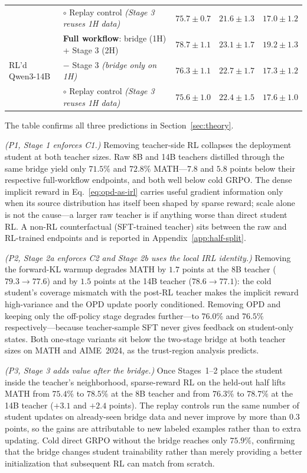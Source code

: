 \documentclass{article}
\begin{document}
\begin{table}[t]
\begin{tabular}{@{}llccc@{}}
  & $\circ$ Replay control \emph{(Stage 3 reuses 1H data)} & $75.7 \pm 0.7$ & $21.6 \pm 1.3$ & $17.0 \pm 1.2$ \\
\cmidrule(lr){2-5}
\multirow{3}{*}{RL'd Qwen3-14B}
  & \textbf{Full workflow}: bridge (1H) + Stage 3 (2H)    & $\mathbf{78.7 \pm 1.1}$ & $23.1 \pm 1.7$ & $\mathbf{19.2 \pm 1.3}$ \\
  & $-$ Stage 3 \emph{(bridge only on 1H)}                & $76.3 \pm 1.1$ & $22.7 \pm 1.7$ & $17.3 \pm 1.2$ \\
  & $\circ$ Replay control \emph{(Stage 3 reuses 1H data)} & $75.6 \pm 1.0$ & $22.4 \pm 1.5$ & $17.6 \pm 1.0$ \\
\bottomrule
\end{tabular}
\end{table}

The table confirms all three predictions in Section~\ref{sec:theory}.

\emph{(P1, Stage 1 enforces C1.)} Removing teacher-side RL collapses the deployment student at both teacher sizes. Raw 8B and 14B teachers distilled through the same bridge yield only $71.5\%$ and $72.8\%$ MATH---$7.8$ and $5.8$ points below their respective full-workflow endpoints, and both well below cold GRPO. The dense implicit reward in Eq.~\ref{eq:opd-as-irl} carries useful gradient information only when its source distribution has itself been shaped by sparse reward; scale alone is not the cause---a larger raw teacher is if anything worse than direct student RL. A non-RL counterfactual (SFT-trained teacher) sits between the raw and RL-trained endpoints and is reported in Appendix~\ref{app:half-split}.

\emph{(P2, Stage 2a enforces C2 and Stage 2b uses the local IRL identity.)} Removing the forward-KL warmup degrades MATH by $1.7$ points at the 8B teacher ($79.3 \to 77.6$) and by $1.5$ points at the 14B teacher ($78.6 \to 77.1$): the cold student's coverage mismatch with the post-RL teacher makes the implicit reward high-variance and the OPD update poorly conditioned. Removing OPD and keeping only the off-policy stage degrades further---to $76.0\%$ and $76.5\%$ respectively---because teacher-sample SFT never gives feedback on student-only states. Both one-stage variants sit below the two-stage bridge at both teacher sizes on MATH and AIME~2024, as the trust-region analysis predicts.

\emph{(P3, Stage 3 adds value after the bridge.)} Once Stages~1--2 place the student inside the teacher's neighborhood, sparse-reward RL on the held-out half lifts MATH from $75.4\%$ to $78.5\%$ at the 8B teacher and from $76.3\%$ to $78.7\%$ at the 14B teacher ($+3.1$ and $+2.4$ points). The replay controls run the same number of student updates on already-seen bridge data and never improve by more than $0.3$ points, so the gains are attributable to new labeled examples rather than to extra updating. Cold direct GRPO without the bridge reaches only $75.9\%$, confirming that the bridge changes student trainability rather than merely providing a better initialization that subsequent RL can match from scratch.
\end{document}
